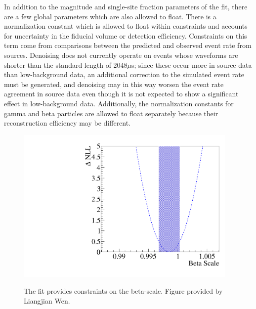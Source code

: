 In addition to the magnitude and single-site fraction parameters of the fit, there are a few global parameters which are also allowed to float.  There is a normalization constant which is allowed to float within constraints and accounts for uncertainty in the fiducial volume or detection efficiency.  Constraints on this term come from comparisons between the predicted and observed event rate from sources.  Denoising does not currently operate on events whose waveforms are shorter than the standard length of $2048 \mu$s; since these occur more in source data than low-background data, an additional correction to the simulated event rate must be generated, and denoising may in this way worsen the event rate agreement in source data even though it is not expected to show a significant effect in low-background data.  Additionally, the normalization constants for gamma and beta particles are allowed to float separately because their reconstruction efficiency may be different.

\begin{figure}
\begin{center}
\includegraphics[keepaspectratio=true,height=3in]{NLLProfile_bscale_scan.pdf}
\end{center}
\renewcommand{\baselinestretch}{1}
\small\normalsize
\begin{quote}
\caption{The fit provides constraints on the beta-scale.  Figure provided by Liangjian Wen.}
\label{fig:BetaScaleNLL}
\end{quote}
\end{figure}
\renewcommand{\baselinestretch}{2}
\small\normalsize

